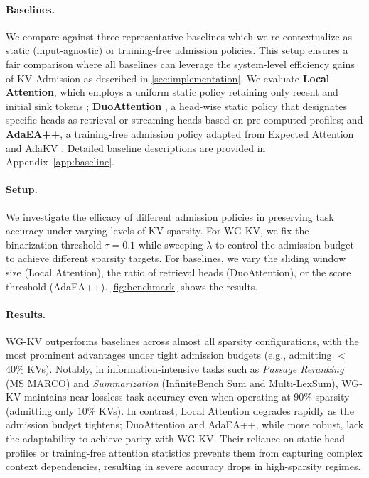 \paragraph{Baselines.} We compare against three representative baselines which we re-contextualize as static (input-agnostic) or training-free admission policies. This setup ensures a fair comparison where all baselines can leverage the system-level efficiency gains of KV Admission as described in \cref{sec:implementation}. We evaluate \textbf{Local Attention}, which employs a uniform static policy retaining only recent and initial sink tokens \cite{streamingllm}; \textbf{DuoAttention} \cite{duoattn}, a head-wise static policy that designates specific heads as retrieval or streaming heads based on pre-computed profiles; and \textbf{AdaEA++}, a training-free admission policy adapted from Expected Attention \cite{expectedattn} and AdaKV \cite{adakv}. Detailed baseline descriptions are provided in Appendix~\ref{app:baseline}.

\paragraph{Setup.} We investigate the efficacy of different admission policies in preserving task accuracy under varying levels of KV sparsity. For WG-KV, we fix the binarization threshold $\tau=0.1$ while sweeping $\lambda$ to control the admission budget to achieve different sparsity targets. For baselines, we vary the sliding window size (Local Attention), the ratio of retrieval heads (DuoAttention), or the score threshold (AdaEA++). \cref{fig:benchmark} shows the results.

\paragraph{Results.} WG-KV outperforms baselines across almost all sparsity configurations, with the most prominent advantages under tight admission budgets (e.g., admitting $<$40\% KVs). Notably, in information-intensive tasks such as \textit{Passage Reranking} (MS MARCO) and \textit{Summarization} (InfiniteBench Sum and Multi-LexSum), WG-KV maintains near-lossless task accuracy even when operating at 90\% sparsity (admitting only 10\% KVs). In contrast, Local Attention degrades rapidly as the admission budget tightens; DuoAttention and AdaEA++, while more robust, lack the adaptability to achieve parity with WG-KV. Their reliance on static head profiles or training-free attention statistics prevents them from capturing complex context dependencies, resulting in severe accuracy drops in high-sparsity regimes.


